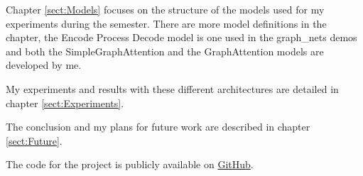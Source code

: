 Chapter \ref{sect:Models} focuses on the structure of the models used for my experiments during the semester. There are more model definitions in the chapter, the Encode Process Decode model is one used in the graph\_nets demos and both the SimpleGraphAttention and the GraphAttention models are developed by me.


My experiments and results with these different architectures are detailed in chapter \ref{sect:Experiments}.

The conclusion and my plans for future work are described in chapter \ref{sect:Future}.

The code for the project is publicly available on
\href{https://github.com/GKingA/graph\_transformations}{GitHub}.

